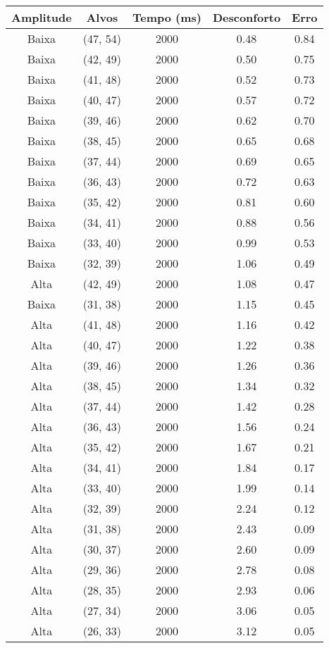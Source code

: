 \begin{tabular}{c c c c c}
\hline
Amplitude & Alvos & Tempo (ms) & Desconforto & Erro \\
\hline
Baixa & (47, 54) &  2000 & 0.48 & 0.84 \\
Baixa & (42, 49) &  2000 & 0.50 & 0.75 \\
Baixa & (41, 48) &  2000 & 0.52 & 0.73 \\
Baixa & (40, 47) &  2000 & 0.57 & 0.72 \\
Baixa & (39, 46) &  2000 & 0.62 & 0.70 \\
Baixa & (38, 45) &  2000 & 0.65 & 0.68 \\
Baixa & (37, 44) &  2000 & 0.69 & 0.65 \\
Baixa & (36, 43) &  2000 & 0.72 & 0.63 \\
Baixa & (35, 42) &  2000 & 0.81 & 0.60 \\
Baixa & (34, 41) &  2000 & 0.88 & 0.56 \\
Baixa & (33, 40) &  2000 & 0.99 & 0.53 \\
Baixa & (32, 39) &  2000 & 1.06 & 0.49 \\
Alta & (42, 49) &  2000 & 1.08 & 0.47 \\
Baixa & (31, 38) &  2000 & 1.15 & 0.45 \\
Alta & (41, 48) &  2000 & 1.16 & 0.42 \\
Alta & (40, 47) &  2000 & 1.22 & 0.38 \\
Alta & (39, 46) &  2000 & 1.26 & 0.36 \\
Alta & (38, 45) &  2000 & 1.34 & 0.32 \\
Alta & (37, 44) &  2000 & 1.42 & 0.28 \\
Alta & (36, 43) &  2000 & 1.56 & 0.24 \\
Alta & (35, 42) &  2000 & 1.67 & 0.21 \\
Alta & (34, 41) &  2000 & 1.84 & 0.17 \\
Alta & (33, 40) &  2000 & 1.99 & 0.14 \\
Alta & (32, 39) &  2000 & 2.24 & 0.12 \\
Alta & (31, 38) &  2000 & 2.43 & 0.09 \\
Alta & (30, 37) &  2000 & 2.60 & 0.09 \\
Alta & (29, 36) &  2000 & 2.78 & 0.08 \\
Alta & (28, 35) &  2000 & 2.93 & 0.06 \\
Alta & (27, 34) &  2000 & 3.06 & 0.05 \\
Alta & (26, 33) &  2000 & 3.12 & 0.05 \\

\end{tabular}
